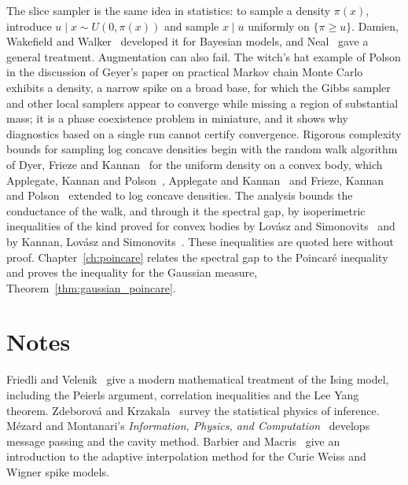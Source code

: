 The slice sampler is the same idea in statistics: to sample a density $\pi(x)$, introduce $u\mid x\sim U(0,\pi(x))$ and sample $x\mid u$ uniformly on $\{\pi\geq u\}$. Damien, Wakefield and Walker~\cite{damien1999} developed it for Bayesian models, and Neal~\cite{neal2003} gave a general treatment. Augmentation can also fail. The witch's hat example of Polson in the discussion of Geyer's paper on practical Markov chain Monte Carlo~\cite{polson1992} exhibits a density, a narrow spike on a broad base, for which the Gibbs sampler and other local samplers appear to converge while missing a region of substantial mass; it is a phase coexistence problem in miniature, and it shows why diagnostics based on a single run cannot certify convergence. Rigorous complexity bounds for sampling log concave densities begin with the random walk algorithm of Dyer, Frieze and Kannan~\cite{dyer1991} for the uniform density on a convex body, which Applegate, Kannan and Polson~\cite{akp1990}, Applegate and Kannan~\cite{applegate1991} and Frieze, Kannan and Polson~\cite{frieze1994} extended to log concave densities. The analysis bounds the conductance of the walk, and through it the spectral gap, by isoperimetric inequalities of the kind proved for convex bodies by Lov\'asz and Simonovits~\cite{lovasz1993} and by Kannan, Lov\'asz and Simonovits~\cite{kannan1995}. These inequalities are quoted here without proof. Chapter~\ref{ch:poincare} relates the spectral gap to the Poincar\'e inequality and proves the inequality for the Gaussian measure, Theorem~\ref{thm:gaussian_poincare}.



\section*{Notes}

Friedli and Velenik~\cite{friedli2017} give a modern mathematical treatment of the Ising model, including the Peierls argument, correlation inequalities and the Lee Yang theorem. Zdeborov\'a and Krzakala~\cite{zdeborova2016} survey the statistical physics of inference. M\'ezard and Montanari's \emph{Information, Physics, and Computation}~\cite{mezard2009} develops message passing and the cavity method. Barbier and Macris~\cite{barbier2019c} give an introduction to the adaptive interpolation method for the Curie Weiss and Wigner spike models.
